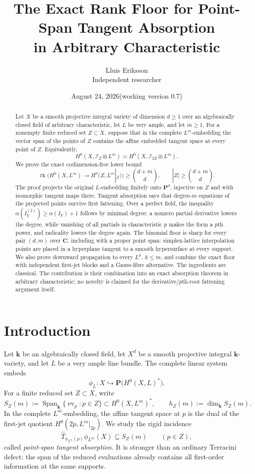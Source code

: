 \documentclass[11pt]{article}
\title{The Exact Rank Floor for Point-Span Tangent Absorption\\
in Arbitrary Characteristic}
\author{Lluis Eriksson\\\small Independent researcher}
\date{August 24, 2026\quad (working version 0.7)}
\newcommand{\PP}{\mathbf P}
\newcommand{\CC}{\mathbf C}
\newcommand{\kk}{\mathbf k}
\newcommand{\cI}{\mathcal I}
\newcommand{\Span}{\operatorname{Span}}
\newcommand{\rk}{\operatorname{rk}}
\begin{document}
\maketitle

\begin{abstract}
Let $X$ be a smooth projective integral variety of dimension $d\geq1$ over an
algebraically closed field of arbitrary characteristic, let $L$ be very ample,
and let $m\geq1$.  For a nonempty finite reduced set
$Z\subset X$, suppose that in the complete $L^m$-embedding the vector span of
the points of $Z$ contains the affine embedded tangent space at every point of
$Z$.  Equivalently,
\[
 H^0(X,\cI_Z\otimes L^m)=H^0(X,\cI_{2Z}\otimes L^m).
\]
We prove the exact codimension-free lower bound
\[
 \rk\bigl(H^0(X,L^m)\to H^0(Z,L^m|_Z)\bigr)
 \geq\binom{d+m}{d},\qquad |Z|\geq\binom{d+m}{d}.
\]
The proof projects the original $L$-embedding finitely onto $\PP^d$, injective
on $Z$ and with isomorphic tangent maps there.  Tangent absorption says that
degree-$m$ equations of the projected points survive first fattening.  Over a
perfect field, the inequality
$\alpha(I_Y^{(2)})\geq\alpha(I_Y)+1$ follows by minimal degree: a nonzero
partial derivative lowers the degree, while vanishing of all partials in
characteristic $p$ makes the form a $p$th power, and radicality lowers the
degree again.  The binomial floor is sharp for every pair $(d,m)$ over
$\CC$, including with a proper point span: simplex-lattice interpolation
points are placed in a hyperplane tangent to a smooth hypersurface at every
support.  We also prove
downward propagation to every $L^k$, $k\leq m$, and combine the exact floor
with independent first-jet blocks and a Gauss-fibre alternative.  The
ingredients are classical.  The contribution is their combination into an
exact absorption theorem in arbitrary characteristic; no novelty is claimed
for the derivative/$p$th-root fattening argument itself.
\end{abstract}

\section{Introduction}

Let $\kk$ be an algebraically closed field, let $X^d$ be a smooth projective
integral $\kk$-variety, and let $L$ be a very ample line bundle.  The complete
linear system embeds
\[
 \phi_L:X\hookrightarrow\PP\bigl(H^0(X,L)^*\bigr).
\]
For a finite reduced set $Z\subset X$, write
\[
 S_Z(m):=\Span_{\kk}\{\operatorname{ev}_p:p\in Z\}
          \subset H^0(X,L^m)^*,
 \qquad h_Z(m):=\dim_{\kk}S_Z(m).
\]
In the complete $L^m$-embedding, the affine tangent space at $p$ is the dual
of the first-jet quotient $H^0(2p,L^m|_{2p})$.  We study the rigid incidence
\begin{equation}\label{eq:absorption-intro}
 \widehat T_{\phi_{L^m}(p)}\phi_{L^m}(X)\subseteq S_Z(m)
 \qquad(p\in Z),
\end{equation}
called \emph{point-span tangent absorption}.  It is stronger than an ordinary
Terracini defect: the span of the reduced evaluations already contains all
first-order information at the same supports.
\end{document}
